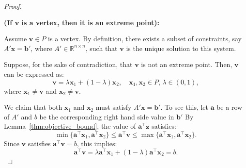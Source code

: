 \begin{proof}
\begin{center}
\end{center}


\textbf{(If \(\mathbf{v}\) is a vertex, then it is an extreme point):}

Assume \( \mathbf{v} \in P \) is a vertex. By definition, there exists a subset of constraints, say \( A'\mathbf{x} = \mathbf{b}' \), where \( A' \in \mathbb{R}^{n \times n} \), such that \( \mathbf{v} \) is the unique solution to this system.

Suppose, for the sake of contradiction, that \( \mathbf{v} \) is not an extreme point. Then, \( \mathbf{v} \) can be expressed as:
\[
\mathbf{v} = \lambda \mathbf{x}_1 + (1 - \lambda) \mathbf{x}_2, \quad \mathbf{x}_1, \mathbf{x}_2 \in P, \, \lambda \in (0, 1),
\]
where \( \mathbf{x}_1 \neq \mathbf{v} \) and \( \mathbf{x}_2 \neq \mathbf{v} \).

We claim that both \( \mathbf{x}_1 \) and \( \mathbf{x}_2 \) must satisfy \( A'\mathbf{x} = \mathbf{b}' \).  To see this, 
let $\mathbf{a}$ be a row of $A'$ and $b$ be the corresponding right hand side value in $\mathbf{b}'$
By Lemma~\ref{thm:objective_bound}, the value of \( \mathbf{a}^\top \mathbf{z} \) satisfies:
\[
\min\{\mathbf{a}^\top\mathbf{x}_1, \mathbf{a}^\top\mathbf{x}_2\} \leq \mathbf{a}^\top\mathbf{v} \leq \max\{\mathbf{a}^\top\mathbf{x}_1, \mathbf{a}^\top\mathbf{x}_2\}.
\]
Since \( \mathbf{v} \) satisfies \( \mathbf{a}^\top\mathbf{v} = b\), this implies:
\[
\mathbf{a}^\top\mathbf{v} = \lambda \mathbf{a}^\top\mathbf{x}_1 + (1-\lambda) \mathbf{a}^\top\mathbf{x}_2 = b.
\]


\end{proof}
